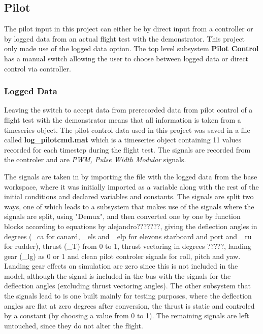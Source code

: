 \subsection{Pilot}

The pilot input in this project can either be by direct input from a controller or by logged data from an actual flight test with the demonstrator. This project only made use of the logged data option. The top level subsystem \textbf{Pilot Control} has a manual switch allowing the user to choose between logged data or direct control via controller.

\subsubsection{Logged Data}

Leaving the switch to accept data from prerecorded data from pilot control of a flight test with the demonstrator means that all information is taken from a timeseries object. The pilot control data used in this project was saved in a file called \textbf{log_pilotcmd.mat} which is a timeseries object containing 11 values recorded for each timestep during the flight test. The signals are recorded from the controler and are \textit{PWM, Pulse Width Modular} signals.

The signals are taken in by importing the file with the logged data from the base workspace, where it was initially imported as a variable along with the rest of the initial conditions and declared variables and constants. The signals are split two ways, one of which leads to a subsystem that makes use of the signals where the signals are split, using "Demux", and then converted one by one by function blocks according to equations by alejandro???????, giving the deflection angles in degrees (\delta_{ca} for canard, \delta_{els} and \delta_{elp} for elevons starboard and port and \delta_{ru} for rudder), thrust (\delta_{T}) from 0 to 1, thrust vectoring in degrees ?????, landing gear (\delta_{lg}) as 0 or 1 and clean pilot controler signals for roll, pitch and yaw. Landing gear effects on simulation are zero since this is not included in the model, although the signal is included in the bus with the signals for the deflection angles (excluding thrust vectoring angles). The other subsystem that the signals lead to is one built mainly for testing purposes, where the deflection angles are flat at zero degrees after conversion, the thrust is static and controled by a constant (by choosing a value from 0 to 1). The remaining signals are left untouched, since they do not alter the flight.

